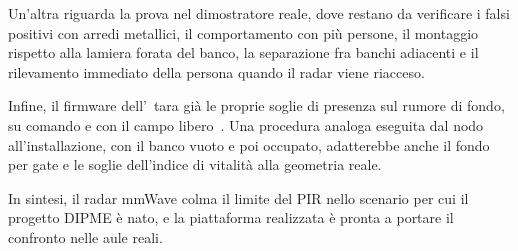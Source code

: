 Un'altra riguarda la prova nel dimostratore reale, dove restano da verificare i falsi positivi con arredi metallici, il comportamento con più persone, il montaggio rispetto alla lamiera forata del banco, la separazione fra banchi adiacenti e il rilevamento immediato della persona quando il radar viene riacceso.

Infine, il firmware dell'\ldb\ tara già le proprie soglie di presenza sul rumore di fondo, su comando e con il campo libero~\cite{hilinkV244}. Una procedura analoga eseguita dal nodo all'installazione, con il banco vuoto e poi occupato, adatterebbe anche il fondo per gate e le soglie dell'indice di vitalità alla geometria reale.

In sintesi, il radar mmWave colma il limite del PIR nello scenario per cui il progetto DIPME è nato, e la piattaforma realizzata è pronta a portare il confronto nelle aule reali.

